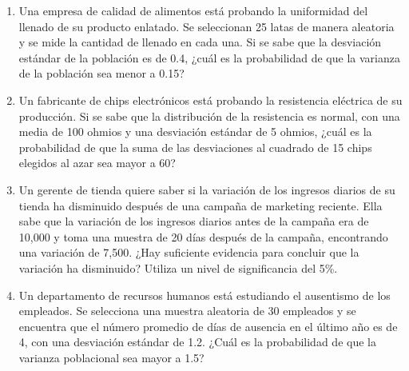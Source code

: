 \begin{Ejer}
\begin{enumerate}
    \item Una empresa de calidad de alimentos está probando la uniformidad del llenado de su producto enlatado. Se seleccionan 25 latas de manera aleatoria y se mide la cantidad de llenado en cada una. Si se sabe que la desviación estándar de la población es de 0.4, ¿cuál es la probabilidad de que la varianza de la población sea menor a 0.15?
    \item Un fabricante de chips electrónicos está probando la resistencia eléctrica de su producción. Si se sabe que la distribución de la resistencia es normal, con una media de 100 ohmios y una desviación estándar de 5 ohmios, ¿cuál es la probabilidad de que la suma de las desviaciones al cuadrado de 15 chips elegidos al azar sea mayor a 60?
    \item Un gerente de tienda quiere saber si la variación de los ingresos diarios de su tienda ha disminuido después de una campaña de marketing reciente. Ella sabe que la variación de los ingresos diarios antes de la campaña era de 10{,}000 y toma una muestra de 20 días después de la campaña, encontrando una variación de 7{,}500. ¿Hay suficiente evidencia para concluir que la variación ha disminuido? Utiliza un nivel de significancia del 5\%.
    \item Un departamento de recursos humanos está estudiando el ausentismo de los empleados. Se selecciona una muestra aleatoria de 30 empleados y se encuentra que el número promedio de días de ausencia en el último año es de 4, con una desviación estándar de 1.2. ¿Cuál es la probabilidad de que la varianza poblacional sea mayor a 1.5?
\end{enumerate}
\end{Ejer} 

